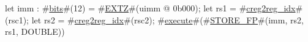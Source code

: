 let imm : #\hyperref[sailRISCVzbits]{bits}#(12) = #\hyperref[sailRISCVzEXTZ]{EXTZ}#(uimm @ 0b000);
let rs1 = #\hyperref[sailRISCVzcreg2regzyidx]{creg2reg\_idx}#(rsc1);
let rs2 = #\hyperref[sailRISCVzcreg2regzyidx]{creg2reg\_idx}#(rsc2);
#\hyperref[sailRISCVzexecute]{execute}#(#\hyperref[sailRISCVzSTOREzyFP]{STORE\_FP}#(imm, rs2, rs1, DOUBLE))
